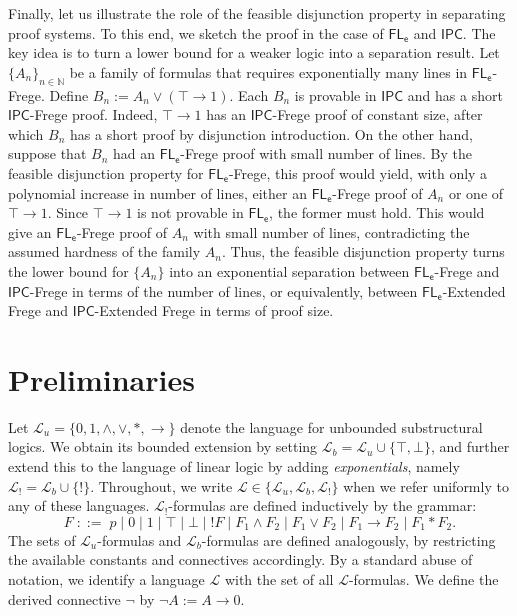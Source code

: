\documentclass[12pt,a4paper]{article}
\theoremstyle{plain}
\theoremstyle{definition}
\newcommand{\st}{*}
\begin{document}
Finally, let us illustrate the role of the feasible disjunction property in separating proof systems. To this end, we sketch the proof in the case of $\mathsf{FL_e}$ and $\mathsf{IPC}$. The key idea is to turn a lower bound for a weaker logic into a separation result. Let $\{A_n\}_{n \in \mathbb{N}}$ be a family of formulas that requires exponentially many lines in $\mathsf{FL_e}$-Frege. Define
$
B_n := A_n \vee (\top \to 1).
$
Each $B_n$ is provable in $\mathsf{IPC}$ and has a short $\mathsf{IPC}$-Frege proof. Indeed, $\top \to 1$ has an $\mathsf{IPC}$-Frege proof of constant size, after which $B_n$ has a short proof by disjunction introduction. On the other hand, suppose that $B_n$ had an $\mathsf{FL_e}$-Frege proof with small number of lines. By the feasible disjunction property for $\mathsf{FL_e}$-Frege, this proof would yield, with only a polynomial increase in number of lines, either an $\mathsf{FL_e}$-Frege proof of $A_n$ or one of $\top \to 1$. Since $\top \to 1$ is not provable in $\mathsf{FL_e}$, the former must hold. This would give an $\mathsf{FL_e}$-Frege proof of $A_n$ with small number of lines, contradicting the assumed hardness of the family ${A_n}$. Thus, the feasible disjunction property turns the lower bound for $\{A_n\}$ into an exponential separation between $\mathsf{FL_e}$-Frege and $\mathsf{IPC}$-Frege in terms of the number of lines, or equivalently, between $\mathsf{FL_e}$-Extended Frege and $\mathsf{IPC}$-Extended Frege in terms of proof size.


\section{Preliminaries}
Let $\mathcal{L}_u=\{0,1,\wedge,\vee,\st,\to\}$ denote the language for unbounded substructural logics. We obtain its bounded extension by setting $\mathcal{L}_b=\mathcal{L}_u\cup\{\top,\bot\}$, and further extend this to the language of linear logic by adding \emph{exponentials}, namely $\mathcal{L}_!=\mathcal{L}_b\cup\{!\}$. Throughout, we write $\mathcal{L}\in\{\mathcal{L}_u,\mathcal{L}_b,\mathcal{L}_!\}$ when we refer uniformly to any of these languages. $\mathcal{L}_!$-formulas are defined inductively by the grammar:
\[
F \;::=\; p \mid 0 \mid 1 \mid \top \mid \bot \mid !F \mid F_1 \wedge F_2 \mid F_1 \vee F_2 \mid F_1 \to F_2 \mid F_1 \st F_2.
\]
The sets of $\mathcal{L}_u$-formulas and $\mathcal{L}_b$-formulas are defined analogously, by restricting the available constants and connectives accordingly.
By a standard abuse of notation, we identify a language $\mathcal{L}$ with the set of all $\mathcal{L}$-formulas.
We define the derived connective $\neg$ by
$\neg A := A \to 0$. 
\end{document}
